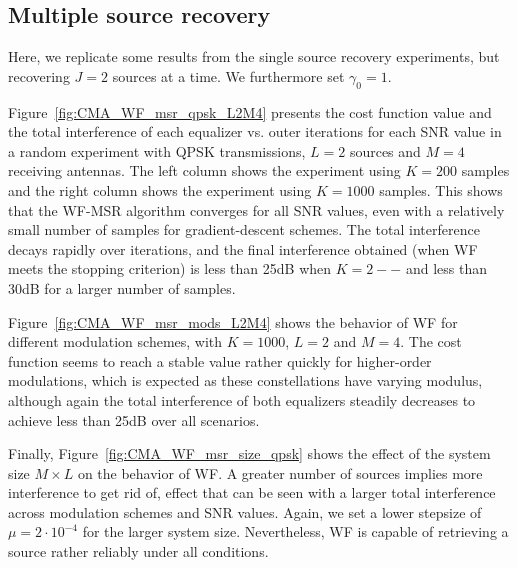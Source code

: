 \newpage
\subsection{Multiple source recovery}\label{sim:WF_MSR}
Here, we replicate some results from the single source recovery experiments, but recovering $J=2$ sources at a time. We furthermore set $\gamma_0=1$.

Figure~\ref{fig:CMA_WF_msr_qpsk_L2M4} presents the cost function value and the total interference of each equalizer vs. outer iterations for each SNR value in a random experiment with QPSK transmissions, $L=2$ sources and $M=4$ receiving antennas. The left column shows the experiment using $K=200$ samples and the right column shows the experiment using $K=1000$ samples. This shows that the WF-MSR algorithm converges for all SNR values, even with a relatively small number of samples for gradient-descent schemes. The total interference decays rapidly over iterations, and the final interference obtained (when WF meets the stopping criterion) is less than 25dB when $K=2--$ and less than 30dB for a larger number of samples.

Figure~\ref{fig:CMA_WF_msr_mods_L2M4} shows the behavior of WF for different modulation schemes, with $K=1000$, $L=2$ and $M=4$. The cost function seems to reach a stable value rather quickly for higher-order modulations, which is expected as these constellations have varying modulus, although again the total interference of both equalizers steadily decreases to achieve less than 25dB over all scenarios.

Finally, Figure~\ref{fig:CMA_WF_msr_size_qpsk} shows the effect of the system size $M\times L$ on the behavior of WF. A greater number of sources implies more interference to get rid of, effect that can be seen with a larger total interference across modulation schemes and SNR values. Again, we set a lower stepsize of $\mu=2\cdot 10^{-4}$ for the larger system size. Nevertheless, WF is capable of retrieving a source rather reliably under all conditions.

